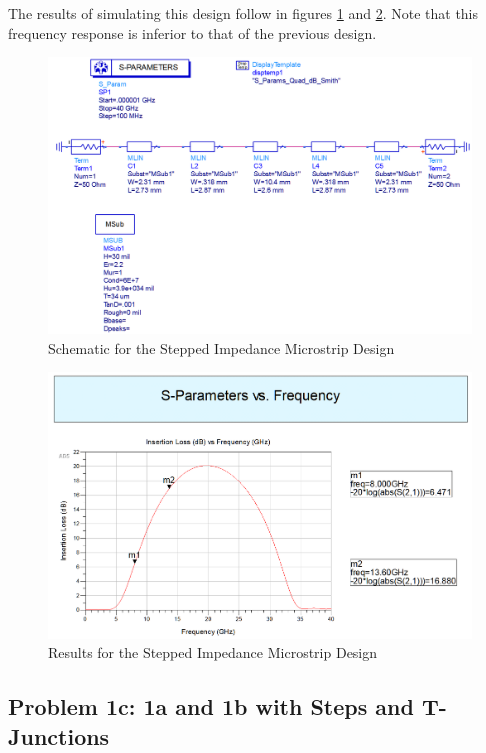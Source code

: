     The results of simulating this design follow in
    figures \ref{fig:img/Problem1/MicrostripSteppedImpedanceSchematic.PNG} and
    \ref{fig:img/Problem1/MicrostripSteppedImpedanceResults}. Note that this frequency
    response is inferior to that of the previous design.

    \begin{figure}[H]
        \centering
        \includegraphics[width=0.8\linewidth]{img/Problem1/MicrostripSteppedImpedanceSchematic.PNG}
        \caption{Schematic for the Stepped Impedance Microstrip Design}
        \label{fig:img/Problem1/MicrostripSteppedImpedanceSchematic.PNG}
    \end{figure}

    \begin{figure}[H]
        \centering
        \includegraphics[width=0.8\linewidth]{img/Problem1/MicrostripSteppedImpedanceResults.PNG}
        \caption{Results for the Stepped Impedance Microstrip Design}
        \label{fig:img/Problem1/MicrostripSteppedImpedanceResults}
    \end{figure}

    \subsection*{Problem 1c: 1a and 1b with Steps and T-Junctions}

